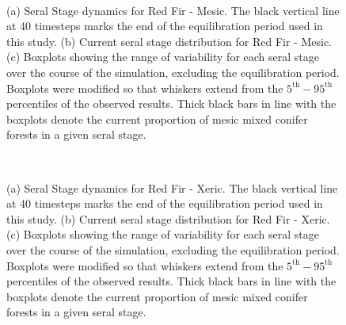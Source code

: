 \begin{figure}[!htbp]
  \centering
  \\
  \caption{(a) Seral Stage dynamics for Red Fir - Mesic. The black vertical line at 40 timesteps marks the end of the equilibration period used in this study. (b) Current seral stage distribution for Red Fir - Mesic. (c) Boxplots showing the range of variability for each seral stage over the course of the simulation, excluding the equilibration period. Boxplots were modified so that whiskers extend from the $5^{\text{th}} - 95^{\text{th}}$ percentiles of the observed results. Thick black bars in line with the boxplots denote the current proportion of mesic mixed conifer forests in a given seral stage.} 
  \label{fig:covcond_rfrm}
\end{figure}

\begin{figure}[!htbp]
  \centering
  \\
  \caption{(a) Seral Stage dynamics for Red Fir - Xeric. The black vertical line at 40 timesteps marks the end of the equilibration period used in this study. (b) Current seral stage distribution for Red Fir - Xeric. (c) Boxplots showing the range of variability for each seral stage over the course of the simulation, excluding the equilibration period. Boxplots were modified so that whiskers extend from the $5^{\text{th}} - 95^{\text{th}}$ percentiles of the observed results. Thick black bars in line with the boxplots denote the current proportion of mesic mixed conifer forests in a given seral stage.} 
  \label{fig:covcond_rfrx}
\end{figure}

